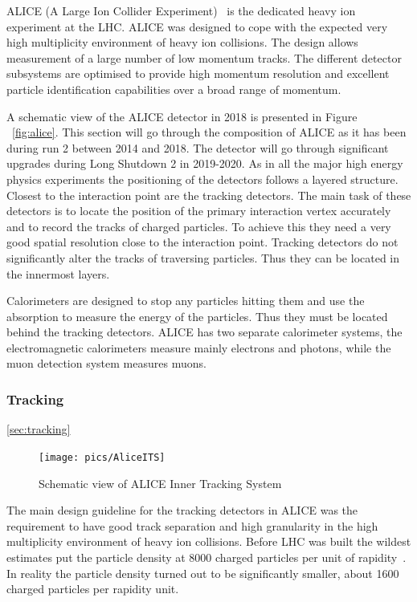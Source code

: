 ALICE (A Large Ion Collider Experiment)~\cite{ALICE} is the dedicated heavy ion experiment at the LHC. ALICE was designed to cope with the expected very high multiplicity environment of heavy ion collisions. The design allows measurement of a large number of low momentum tracks. The different detector subsystems are optimised to provide high momentum resolution and excellent particle identification capabilities over a broad range of momentum.

A schematic view of the ALICE detector in 2018 is presented in Figure ~\ref{fig:alice}. This section will go through the composition of ALICE as it has been during run 2 between 2014 and 2018. The detector will go through significant upgrades during Long Shutdown 2 in 2019-2020. As in all the major high energy physics experiments the positioning of the detectors follows a layered structure. Closest to the interaction point are the tracking detectors. The main task of these detectors is to locate the position of the primary interaction vertex accurately and to record the tracks of charged particles. To achieve this they need a very good spatial resolution close to the interaction point. Tracking detectors do not significantly alter the tracks of traversing particles. Thus they can be located in the innermost layers.

Calorimeters are designed to stop any particles hitting them and use the absorption to measure the energy of the particles. Thus they must be located behind the tracking detectors. ALICE has two separate calorimeter systems, the electromagnetic calorimeters measure mainly electrons and photons, while the muon detection system measures muons.


\subsubsection{Tracking}
\ref{sec:tracking}
\begin{figure}[htb]
\centering
\texttt{[image: pics/AliceITS]}
\caption[ITS]{Schematic view of ALICE Inner Tracking System}
\label{fig:its}
\end{figure}


The main design guideline for the tracking detectors in ALICE was the requirement to have good track separation and high granularity in the high multiplicity environment of heavy ion collisions. Before LHC was built the wildest estimates put the particle density at 8000 charged particles per unit of rapidity~\cite{}. In reality the particle density turned out to be significantly smaller, about 1600 charged particles per rapidity unit.~\cite{}

